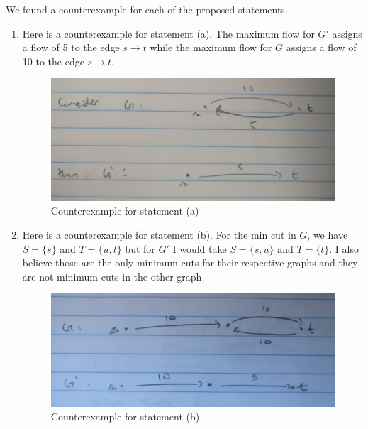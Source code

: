 \documentclass{article}
\begin{document}
We found a counterexample for each of the proposed statements.
\begin{enumerate}[label=(\alph*)]
    \item Here is a counterexample for statement (a).
    The maximum flow for $G'$ assigns a flow of 5 to the edge $s \to t$ while the maximum flow for $G$ assigns a flow of 10 to the edge $s \to t$.
        \begin{figure}[h]
        \begin{center}
            \includegraphics[scale=0.1]{img/7-4-a}
            \caption{Counterexample for statement (a)}
            \label{fig:7-4-a}
        \end{center}
        \end{figure}
    \item Here is a counterexample for statement (b).
    For the min cut in $G$, we have $S = \{ s \} $ and $T = \{ u, t \} $ but for $G'$ I would take $S = \{ s, u \} $ and $T = \{ t \}$. I also believe those are the only minimum cuts for their respective graphs and they are not minimum cuts in the other graph.
        \begin{figure}[h]
        \begin{center}
            \includegraphics[scale=0.1]{img/7-4-b}
            \caption{Counterexample for statement (b)}
            \label{fig:7-4-b}
        \end{center}
        \end{figure}

\end{enumerate}
\end{document}
